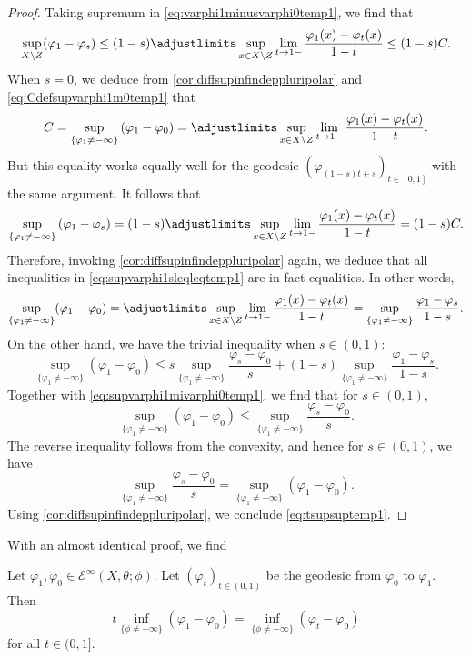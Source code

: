 \begin{proof}
    Taking supremum in \eqref{eq:varphi1minusvarphi0temp1}, we find that
    \begin{equation}\label{eq:supvarphi1sleqleqtemp1}
    \sup_{X\setminus Z} (\varphi_1-\varphi_s)\leq (1-s)\adjustlimits\sup_{x\in X\setminus Z}\lim_{t\to 1-}\frac{\varphi_1(x)-\varphi_t(x)}{1-t}\leq (1-s)C.
    \end{equation}
    When $s=0$, we deduce from \cref{cor:diffsupinfindeppluripolar} and \eqref{eq:Cdefsupvarphi1m0temp1} that
    \[
    C=\sup_{\{\varphi_1\neq -\infty\}} \left(\varphi_1-\varphi_0\right)=\adjustlimits\sup_{x\in X\setminus Z}\lim_{t\to 1-}\frac{\varphi_1(x)-\varphi_t(x)}{1-t}.
    \]
    But this equality works equally well for the geodesic $(\varphi_{(1-s)t+s})_{t\in [0,1]}$ with the same argument. It follows that
    \[
    \sup_{\{\varphi_1\neq -\infty\}} \left(\varphi_1-\varphi_s\right)=(1-s)\adjustlimits\sup_{x\in X\setminus Z}\lim_{t\to 1-}\frac{\varphi_1(x)-\varphi_t(x)}{1-t}=(1-s)C.
    \]
    Therefore, invoking \cref{cor:diffsupinfindeppluripolar} again, we deduce that all inequalities in \eqref{eq:supvarphi1sleqleqtemp1} are in fact equalities. In other words,
    \begin{equation}\label{eq:supvarphi1mivarphi0temp1}
        \sup_{\{\varphi_1\neq -\infty\}}(\varphi_1-\varphi_0)=   \adjustlimits \sup_{x\in X\setminus Z}\lim_{t\to 1-}\frac{\varphi_1(x)-\varphi_t(x)}{1-t}
        =\sup_{\{\varphi_1\neq -\infty\}}\frac{\varphi_1-\varphi_s}{1-s}.
    \end{equation}
    On the other hand, we have the trivial inequality when $s\in (0,1)$:
    \[
    \sup_{\{\varphi_1\neq -\infty\}}(\varphi_1-\varphi_0)\leq s \sup_{\{\varphi_1\neq -\infty\}}\frac{\varphi_s-\varphi_0}{s}+   (1-s) \sup_{\{\varphi_1\neq -\infty\}}\frac{\varphi_1-\varphi_s}{1-s}.
    \]
    Together with \eqref{eq:supvarphi1mivarphi0temp1}, we find that for $s\in (0,1)$,
    \[
    \sup_{\{\varphi_1\neq -\infty\}}(\varphi_1-\varphi_0)\leq \sup_{\{\varphi_1\neq -\infty\}}\frac{\varphi_s-\varphi_0}{s}.
    \]
    The reverse inequality follows from the convexity, and hence for $s\in (0,1)$, we have
    \[
        \sup_{\{\varphi_1\neq -\infty\}}\frac{\varphi_s-\varphi_0}{s}=\sup_{\{\varphi_1\neq -\infty\}}(\varphi_1-\varphi_0).
    \]
    Using \cref{cor:diffsupinfindeppluripolar}, we conclude \eqref{eq:tsupsuptemp1}.
\end{proof}

With an almost identical proof, we find
\begin{proposition}\label{prop:geodinfsublinear}
    Let $\varphi_1,\varphi_0\in \mathcal{E}^{\infty}(X,\theta;\phi)$. Let $(\varphi_t)_{t\in (0,1)}$ be the geodesic from $\varphi_0$ to $\varphi_1$. Then
    \[
        t\inf_{\{\phi\neq -\infty\}}(\varphi_1-\varphi_0)=\inf_{\{\phi\neq -\infty\}}(\varphi_t-\varphi_0)
    \]
    for all $t\in (0,1]$.
\end{proposition}

